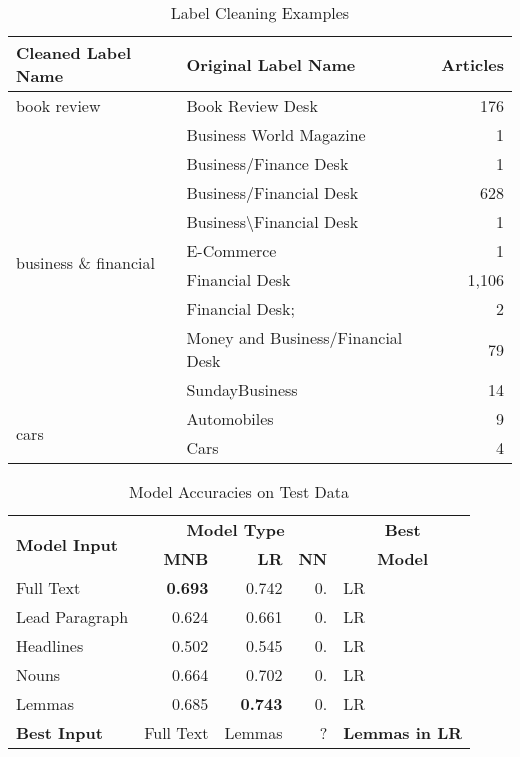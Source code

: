 \documentclass[11pt,a4paper]{article}
\begin{document}
\begin{table}
\centering
\small
\begin{tabular}{llr}
	\hline
	\textbf{Cleaned Label Name} & \textbf{Original Label Name} & \textbf{Articles} \\
	\hline
	book review & Book Review Desk & 176 \\
	\hline
	\multirow{9}{*}{business \& financial} & Business World Magazine & 1 \\
	& Business/Finance Desk & 1 \\
	& Business/Financial Desk & 628 \\
	& Business\textbackslash Financial Desk & 1 \\
	& E-Commerce & 1 \\
	& Financial Desk & 1,106 \\
	& Financial Desk; & 2 \\
	& Money and Business/Financial Desk & 79 \\
	& SundayBusiness & 14 \\
	\hline
	\multirow{2}{*}{cars} & Automobiles & 9 \\
	& Cars & 4 \\
	\hline
\end{tabular}
\caption{Label Cleaning Examples}
\label{tbl:label-clean}
\end{table}

\begin{table}
\centering
\small
\begin{tabular}{|l|rrr|p{1.2cm}|}
	\hline
	\multirow{2}{*}{\textbf{Model Input}} & \multicolumn{3}{c|}{\textbf{Model Type}} & \multicolumn{1}{c|}{\textbf{Best}} \\
	\cline{2-4}
	& \textbf{MNB} & \textbf{LR} & \textbf{NN} & \multicolumn{1}{c|}{\textbf{Model}} \\
	\hline
	Full Text			& \textbf{0.693}	& 0.742		& 0.		& LR \\
	Lead Paragraph	& 0.624		& 0.661		& 0.		& LR \\
	Headlines			& 0.502		& 0.545		& 0.		& LR \\
	Nouns			& 0.664		& 0.702		& 0.		& LR \\
	Lemmas			& 0.685		& \textbf{0.743}	& 0.		& LR \\
	\hline
	\textbf{Best Input} & Full Text & Lemmas & ? & \textbf{Lemmas in LR} \\
	\hline
\end{tabular}
\caption{Model Accuracies on Test Data}
\label{tbl:acc}
\end{table}
\end{document}
